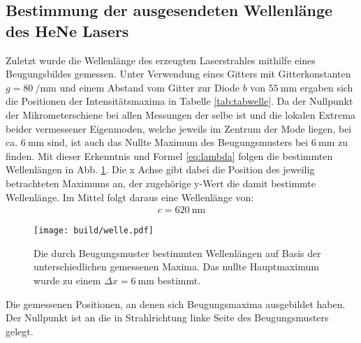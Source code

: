 \subsection{Bestimmung der ausgesendeten Wellenlänge des HeNe Lasers}
Zuletzt wurde die Wellenlänge des erzeugten Laserstrahles mithilfe eines Beugungsbildes gemessen. Unter Verwendung eines Gitters mit Gitterkonstanten $g = \SI{80}{\per\milli\meter}$ und einem Abstand vom Gitter zur Diode $b$ von $\SI{55}{\milli\meter}$ ergaben sich die Positionen der Intensitätsmaxima in Tabelle \ref{tab:tabwelle}. Da der Nullpunkt der Mikrometerschiene bei allen Messungen der selbe ist und die lokalen Extrema beider vermessener Eigenmoden, welche jeweils im Zentrum der Mode liegen, bei ca. $\SI{6}{\milli\meter}$ sind, ist auch das Nullte Maximum des Beugungsmusters bei $\SI{6}{\milli\meter}$ zu finden. Mit dieser Erkenntnis und Formel \eqref{eq:lambda} folgen die bestimmten Wellenlängen in Abb. \ref{fig:welle}. Die x Achse gibt dabei die Position des jeweilig betrachteten Maximums an, der zugehörige y-Wert die damit bestimmte Wellenlänge. Im Mittel folgt daraus eine Wellenlänge von: 
\begin{gather*}
	c = \SI{620}{\nano\meter}
	\end{gather*}







	



\begin{figure}
	\centering
	\texttt{[image: build/welle.pdf]}
	\caption{Die durch Beugungsmuster bestimmten Wellenlängen auf Basis der unterschiedlichen gemessenen Maxima. Das nullte Hauptmaximum wurde zu einem $\Delta x = \SI{6}{\milli\meter}$ bestimmt.}
	\label{fig:welle}
\end{figure}


\begin{table}
	\centering
	\caption{Die gemessenen Positionen, an denen sich Beugungsmaxima ausgebildet haben. Der Nullpunkt ist an die in Strahlrichtung linke Seite des Beugungsmusters gelegt.}
	
	\label{tab:tabwelle}
\end{table}
